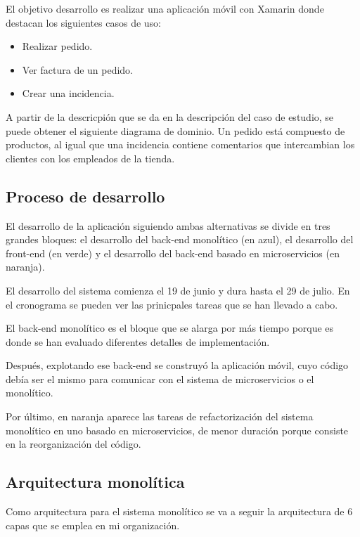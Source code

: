 \documentclass[11pt,a4paper]{article}
\begin{document}
El objetivo desarrollo es realizar una aplicación móvil con Xamarin donde destacan los siguientes casos de uso:

\begin{itemize}

\item Realizar pedido.

\item Ver factura de un pedido.

\item Crear una incidencia.

\end{itemize}

A partir de la descricpión que se da en la descripción del caso de estudio, se puede obtener el siguiente diagrama de dominio. Un pedido está compuesto de productos, al igual que una incidencia contiene comentarios que intercambian los clientes con los empleados de la tienda.

\subsection{Proceso de desarrollo}

El desarrollo de la aplicación siguiendo ambas alternativas se divide en tres grandes bloques: el desarrollo del back-end monolítico (en azul), el desarrollo del front-end (en verde) y el desarrollo del back-end basado en microservicios (en naranja).

El desarrollo del sistema comienza el 19 de junio y dura hasta el 29 de julio. En el cronograma se pueden ver las prinicpales tareas que se han llevado a cabo. 

El back-end monolítico es el bloque que se alarga por más tiempo porque es donde se han evaluado diferentes detalles de implementación. 

Después, explotando ese back-end se construyó la aplicación móvil, cuyo código debía ser el mismo para comunicar con el sistema de microservicios o el monolítico.

Por último, en naranja aparece las tareas de refactorización del sistema monolítico en uno basado en microservicios, de menor duración porque consiste en la reorganización del código.

\subsection{Arquitectura monolítica}

Como arquitectura para el sistema monolítico se va a seguir la arquitectura de 6 capas que se emplea en mi organización.
\end{document}
